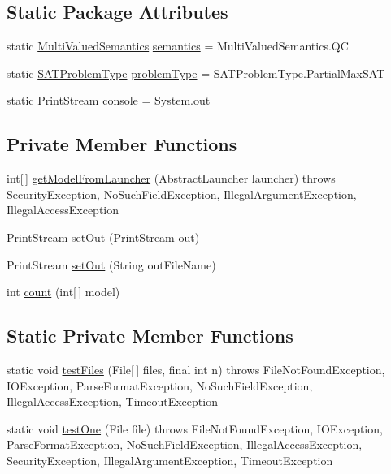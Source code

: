 \subsection*{Static Package Attributes}
\begin{DoxyCompactItemize}
\item 
static \hyperlink{namespaceedu_1_1pku_1_1id_ad71ddcb0be4b31cdeeb2a5d755309f2d}{MultiValuedSemantics} \hyperlink{classedu_1_1pku_1_1id_1_1_i_d_measurer_a525c9e5ca2233b8509ec1133ee9e86c2}{semantics} = MultiValuedSemantics.QC
\item 
static \hyperlink{namespaceedu_1_1pku_1_1id_a7936f4efdc70b70b965d63bd005a2513}{SATProblemType} \hyperlink{classedu_1_1pku_1_1id_1_1_i_d_measurer_a5955b5897c93bd335f41b8c45ef1365e}{problemType} = SATProblemType.PartialMaxSAT
\item 
static PrintStream \hyperlink{classedu_1_1pku_1_1id_1_1_i_d_measurer_a6f306b1fa0b91200df925ca4c7d0dfb2}{console} = System.out
\end{DoxyCompactItemize}
\subsection*{Private Member Functions}
\begin{DoxyCompactItemize}
\item 
int\mbox{[}$\,$\mbox{]} \hyperlink{classedu_1_1pku_1_1id_1_1_i_d_measurer_adc1192ea4608637f1d5f0a4f33b8d8b0}{getModelFromLauncher} (AbstractLauncher launcher)  throws SecurityException, NoSuchFieldException, IllegalArgumentException, 			IllegalAccessException 
\item 
PrintStream \hyperlink{classedu_1_1pku_1_1id_1_1_i_d_measurer_ab0227dd5bd76d967de102ed7d794cd9a}{setOut} (PrintStream out)
\item 
PrintStream \hyperlink{classedu_1_1pku_1_1id_1_1_i_d_measurer_ae3a14a1ef4278a66bac9081a95fbaeb6}{setOut} (String outFileName)
\item 
int \hyperlink{classedu_1_1pku_1_1id_1_1_i_d_measurer_ab286d1ce077786faa0875d8c47ddf2f6}{count} (int\mbox{[}$\,$\mbox{]} model)
\end{DoxyCompactItemize}
\subsection*{Static Private Member Functions}
\begin{DoxyCompactItemize}
\item 
static void \hyperlink{classedu_1_1pku_1_1id_1_1_i_d_measurer_ab33f6e35b6b1754b19f5eecbb68ba63a}{testFiles} (File\mbox{[}$\,$\mbox{]} files, final int n)  throws FileNotFoundException, IOException, ParseFormatException, NoSuchFieldException, 			IllegalAccessException, TimeoutException 
\item 
static void \hyperlink{classedu_1_1pku_1_1id_1_1_i_d_measurer_a27df87766323def178933b6b7316958d}{testOne} (File file)  throws FileNotFoundException, IOException, ParseFormatException, NoSuchFieldException, IllegalAccessException, 			SecurityException, IllegalArgumentException, TimeoutException 
\end{DoxyCompactItemize}
